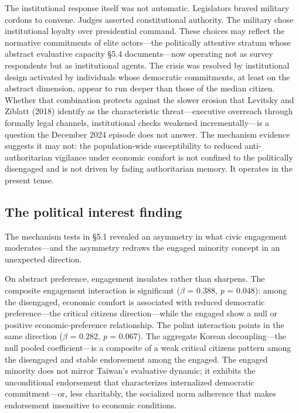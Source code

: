 \documentclass[
  12pt,
  12pt,
  letterpaper]{article}
\begin{document}
The institutional response itself was not automatic. Legislators braved
military cordons to convene. Judges asserted constitutional authority.
The military chose institutional loyalty over presidential command.
These choices may reflect the normative commitments of elite
actors---the politically attentive stratum whose abstract evaluative
capacity §5.4 documents---now operating not as survey respondents but as
institutional agents. The crisis was resolved by institutional design
activated by individuals whose democratic commitments, at least on the
abstract dimension, appear to run deeper than those of the median
citizen. Whether that combination protects against the slower erosion
that Levitsky and Ziblatt (2018) identify as the characteristic
threat---executive overreach through formally legal channels,
institutional checks weakened incrementally---is a question the December
2024 episode does not answer. The mechanism evidence suggests it may
not: the population-wide susceptibility to reduced anti-authoritarian
vigilance under economic comfort is not confined to the politically
disengaged and is not driven by fading authoritarian memory. It operates
in the present tense.

\subsection{The political interest finding}\label{sec-discussion-polint}

The mechanism tests in §5.1 revealed an asymmetry in what civic
engagement moderates---and the asymmetry redraws the engaged minority
concept in an unexpected direction.

On abstract preference, engagement insulates rather than sharpens. The
composite engagement interaction is significant (\(\beta\) = 0.388,
\emph{p} = 0.048): among the disengaged, economic comfort is associated
with reduced democratic preference---the critical citizens
direction---while the engaged show a null or positive
economic-preference relationship. The polint interaction points in the
same direction (\(\beta\) = 0.282, \emph{p} = 0.067). The aggregate
Korean decoupling---the null pooled coefficient---is a composite of a
weak critical citizens pattern among the disengaged and stable
endorsement among the engaged. The engaged minority does not mirror
Taiwan's evaluative dynamic; it exhibits the unconditional endorsement
that characterizes internalized democratic commitment---or, less
charitably, the socialized norm adherence that makes endorsement
insensitive to economic conditions.
\end{document}
